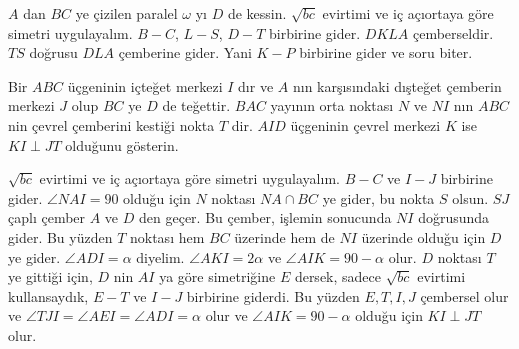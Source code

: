 \documentclass[12pt]{scrartcl}
\begin{document}
\begin{answer*}
    $A$ dan $BC$ ye çizilen paralel $\omega$ yı $D$ de kessin. $\sqrt{bc}$ evirtimi ve iç açıortaya göre simetri uygulayalım. $B-C$, $L-S$, $D-T$ birbirine gider. $DKLA$ çemberseldir. $TS$ doğrusu $DLA$ çemberine gider. Yani $K-P$ birbirine gider ve soru biter.
\end{answer*}

\begin{problem}
    Bir $ABC$ üçgeninin içteğet merkezi $I$ dır ve $A$ nın karşısındaki dışteğet çemberin merkezi $J$ olup $BC$ ye $D$ de teğettir. $BAC$ yayının orta noktası $N$ ve $NI$ nın $ABC$ nin çevrel çemberini kestiği nokta $T$ dir. $AID$ üçgeninin çevrel merkezi $K$ ise $KI\perp JT$ olduğunu gösterin.
\end{problem}

\begin{answer*}
    $\sqrt{bc}$ evirtimi ve iç açıortaya göre simetri uygulayalım. $B-C$ ve $I-J$ birbirine gider. $\angle NAI=90$ olduğu için $N$ noktası $NA\cap BC$ ye gider, bu nokta $S$ olsun. $SJ$ çaplı çember $A$ ve $D$ den geçer. Bu çember, işlemin sonucunda $NI$ doğrusunda gider. Bu yüzden $T$ noktası hem $BC$ üzerinde hem de $NI$ üzerinde olduğu için $D$ ye gider. $\angle ADI=\alpha$ diyelim. $\angle AKI=2\alpha$ ve $\angle AIK=90-\alpha$ olur. $D$ noktası $T$ ye gittiği için, $D$ nin $AI$ ya göre simetriğine $E$ dersek, sadece $\sqrt{bc}$ evirtimi kullansaydık, $E-T$ ve $I-J$ birbirine giderdi. Bu yüzden $E,T,I,J$ çembersel olur ve $\angle TJI=\angle AEI=\angle ADI=\alpha$ olur ve $\angle AIK=90-\alpha$ olduğu için $KI\perp JT$ olur. 
\end{answer*}


\end{document}

